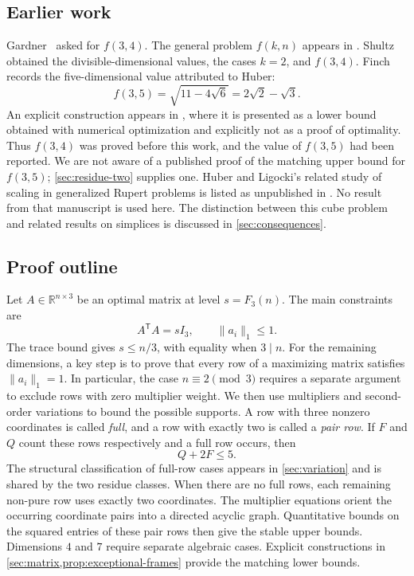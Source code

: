 \documentclass[11pt]{article}
\numberwithin{equation}{section}
\theoremstyle{definition}
\theoremstyle{definition}
\begin{document}
\subsection{Earlier work}
Gardner~\cite{Gardner1966} asked for $f(3,4)$.  The general problem
$f(k,n)$ appears in \cite[Problem~B4]{CFG1991}.  Shultz
\cite{Shultz2013} obtained the divisible-dimensional values, the cases
$k=2$, and $f(3,4)$.  Finch~\cite[Sec.~8.14]{Finch2003} records the
five-dimensional value attributed to Huber:
\[
 f(3,5)=\sqrt{11-4\sqrt6}=2\sqrt2-\sqrt3.
\]
An explicit construction appears in \cite{Firsching2014}, where it is
presented as a lower bound obtained with numerical optimization and
explicitly not as a proof of optimality.
Thus $f(3,4)$ was proved before this work, and the value of $f(3,5)$
had been reported. We are not aware of a published proof of the
matching upper bound for $f(3,5)$; \cref{sec:residue-two} supplies one.
Huber and Ligocki's related study of scaling in generalized Rupert
problems is listed as unpublished in \cite{HSW2018}.
No result from that manuscript is used here.
The distinction between this cube problem and related results on
simplices is discussed in \cref{sec:consequences}.

\subsection{Proof outline}
Let $A\in\mathbb R^{n\times3}$ be an optimal matrix at level
$s=F_3(n)$.  The main constraints are
\[
 A^{\mathsf T}A=sI_3,\qquad \|a_i\|_1\le1.
\]
The trace bound gives $s\le n/3$, with equality when $3\mid n$.
For the remaining dimensions, a key step is to prove that every row
of a maximizing matrix satisfies $\|a_i\|_1=1$. In particular, the
case $n\equiv2\pmod3$ requires a separate argument to exclude rows
with zero multiplier weight. We then use multipliers and second-order
variations to bound the possible supports. A row with three nonzero
coordinates is called \emph{full}, and a row with exactly two is called
a \emph{pair row}. If $F$ and $Q$ count these rows respectively and a
full row occurs, then
\[
 Q+2F\le5.
\]
The structural classification of full-row cases appears in
\cref{sec:variation} and is shared by the two residue classes.
When there are no full rows, each remaining non-pure row uses exactly
two coordinates. The multiplier equations orient the occurring
coordinate pairs into a directed acyclic graph. Quantitative bounds
on the squared entries of these pair rows then give the stable upper
bounds. Dimensions $4$ and $7$ require separate algebraic cases.
Explicit constructions in \cref{sec:matrix,prop:exceptional-frames}
provide the matching lower bounds.
\end{document}
